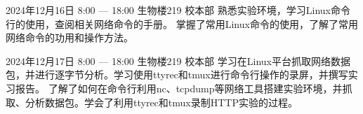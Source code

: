 \documentclass{swfulabjournal}
\begin{document}
\maketitle %

\addjournal%
{2024年12月16日}%
{8:00 --- 18:00}%
{生物楼219}%
{校本部}%
{熟悉实验环境，学习Linux命令行的使用，查阅相关网络命令的手册。}%
{掌握了常用Linux命令的使用，了解了常用网络命令的功用和操作方法。}%




\clearpage
\addjournal%
{2024年12月17日}%
{8:00 --- 18:00}%
{生物楼219}%
{校本部}%
{学习在Linux平台抓取网络数据包，并进行逐字节分析。学习使用ttyrec和tmux进行命令行操作的录屏，并撰写实习报告。}%
{了解了如何在命令行利用nc、tcpdump等网络工具搭建实验环境，并抓取、分析数据包。学会了利用ttyrec和tmux录制HTTP实验的过程。}%
\end{document}
